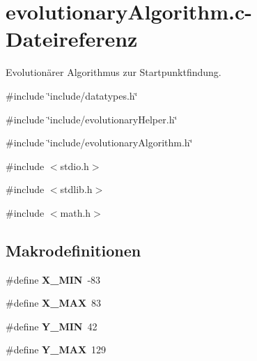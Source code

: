 \section{evolutionaryAlgorithm.c-\/Dateireferenz}
\label{evolutionary_algorithm_8c}


Evolutionärer Algorithmus zur Startpunktfindung.  


{\ttfamily \#include \char`\"{}include/datatypes.h\char`\"{}}\par
{\ttfamily \#include \char`\"{}include/evolutionaryHelper.h\char`\"{}}\par
{\ttfamily \#include \char`\"{}include/evolutionaryAlgorithm.h\char`\"{}}\par
{\ttfamily \#include $<$stdio.h$>$}\par
{\ttfamily \#include $<$stdlib.h$>$}\par
{\ttfamily \#include $<$math.h$>$}\par
\subsection*{Makrodefinitionen}
\begin{DoxyCompactItemize}
\item 
\#define {\bf X\_\-MIN}~-\/83
\item 
\#define {\bf X\_\-MAX}~83
\item 
\#define {\bf Y\_\-MIN}~42
\item 
\#define {\bf Y\_\-MAX}~129
\end{DoxyCompactItemize}
